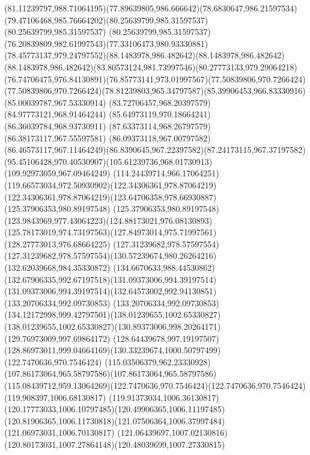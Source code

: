 {    \curveto(81.11239797,988.71064195)(77.89639805,986.666642)(78.6830647,986.21597534)
    \curveto(79.47106468,985.76664202)(80.25639799,985.31597537)(80.25639799,985.31597537)
    \curveto(80.25639799,985.31597537)(76.20839809,982.61997543)(77.33106473,980.93330881)
    \curveto(78.45773137,979.24797552)(88.1483978,986.482642)(88.1483978,986.482642)
    \curveto(88.1483978,986.482642)(83.80573124,981.73997546)(80.27773133,979.29064218)
    \curveto(76.74706475,976.84130891)(76.85773141,973.01997567)(77.50839806,970.7266424)
    \curveto(77.50839806,970.7266424)(78.81239803,965.34797587)(85.39906453,966.83330916)
    \lineto(85.00039787,967.53330914)
    \lineto(83.72706457,968.20397579)
    \lineto(84.97773121,968.91464244)
    \lineto(85.64973119,970.18664241)
    \lineto(86.36039784,968.93730911)
    \lineto(87.63373114,968.26797579)
    \lineto(86.38173117,967.55597581)
    \lineto(86.09373118,967.00797582)
    \curveto(86.46573117,967.11464249)(86.8390645,967.22397582)(87.24173115,967.37197582)
    \curveto(95.45106428,970.40530907)(105.61239736,968.01730913)(109.92973059,967.09464249)
    \curveto(114.24439714,966.17064251)(119.66573034,972.50930902)(122.34306361,978.87064219)
    \curveto(122.34306361,978.87064219)(123.64706358,978.66930887)(125.37906353,980.89197548)
    \curveto(125.37906353,980.89197548)(123.9843969,977.43064223)(124.88173021,976.08130893)
    \curveto(125.78173019,974.73197563)(127.84973014,975.71997561)(128.27773013,976.68664225)
    \lineto(127.31239682,978.57597554)
    \curveto(127.31239682,978.57597554)(130.57239674,980.26264216)(132.62039668,984.35330872)
    \curveto(134.6670633,988.44530862)(132.67906335,992.67197518)(131.09373006,994.39197514)
    \curveto(131.09373006,994.39197514)(132.64573002,992.94130851)(133.20706334,992.09730853)
    \curveto(133.20706334,992.09730853)(134.12172998,999.42797501)(138.01239655,1002.65330827)
    \curveto(138.01239655,1002.65330827)(130.89373006,998.20264171)(129.76973009,997.69864172)
    \curveto(128.64439678,997.19197507)(128.86973011,999.04664169)(130.33239674,1000.50797499)
    \moveto(122.7470636,970.7546424)
    \curveto(115.03506379,962.23330928)(107.86173064,965.58797586)(107.86173064,965.58797586)
    \curveto(115.08439712,959.13064269)(122.7470636,970.7546424)(122.7470636,970.7546424)
    \moveto(119.908397,1006.68130817)
    \curveto(119.91373034,1006.36130817)(120.17773033,1006.10797485)(120.49906365,1006.11197485)
    \curveto(120.81906365,1006.11730818)(121.07506364,1006.37997484)(121.06973031,1006.70130817)
    \curveto(121.06439697,1007.02130816)(120.80173031,1007.27864148)(120.48039699,1007.27330815)
}
